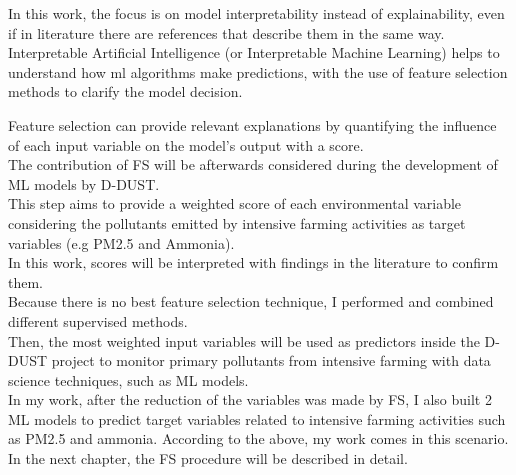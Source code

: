 In this work, the focus is on model interpretability instead of explainability, even if in literature there are references that describe them in the same way.\\
Interpretable Artificial Intelligence (or Interpretable Machine Learning) helps to understand how \acrshort{ml} algorithms make predictions, with the use of feature selection methods to clarify the model decision.
\par
Feature selection can provide relevant explanations by quantifying the influence of each input variable on the model's output with a score.\\
The contribution of FS will be afterwards considered during the development of ML models by D-DUST.\\
This step aims to provide a weighted score of each environmental variable considering the pollutants emitted by intensive farming activities as target variables (e.g PM2.5 and Ammonia). \\
In this work, scores will be interpreted with findings in the literature to confirm them.\\
Because there is no best feature selection technique, I performed and combined different supervised methods. \\
Then, the most weighted input variables will be used as predictors inside the D-DUST project to monitor primary pollutants from intensive farming with data science techniques, such as ML models.\\
In my work, after the reduction of the variables was made by FS, I also built 2 ML models to predict target variables related to intensive farming activities such as PM2.5 and ammonia.
\bigbreak
According to the above, my work comes in this scenario.
In the next chapter, the FS procedure will be described in detail.
\\
